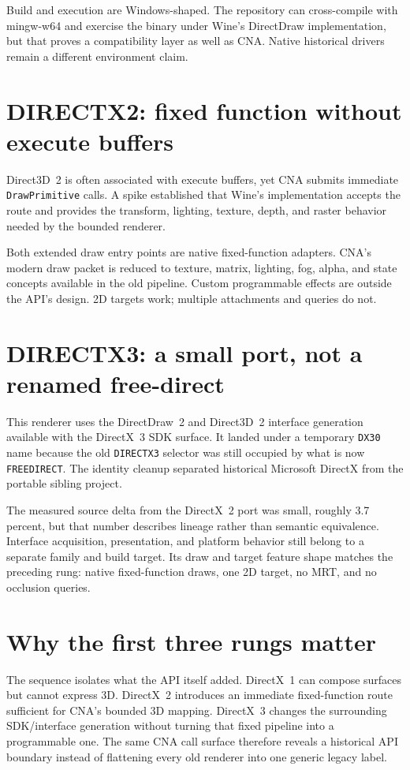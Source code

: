 Build and execution are Windows-shaped.  The repository can cross-compile with mingw-w64 and
exercise the binary under Wine's DirectDraw implementation, but that proves a compatibility
layer as well as CNA.  Native historical drivers remain a different environment claim.

\section{DIRECTX2: fixed function without execute buffers}

Direct3D~2 is often associated with execute buffers, yet CNA submits immediate
\texttt{DrawPrimitive} calls. A spike established that Wine's implementation accepts the route
and provides the transform, lighting, texture,
depth, and raster behavior needed by the bounded renderer.

Both extended draw entry points are native fixed-function adapters.  CNA's modern draw packet
is reduced to texture, matrix, lighting, fog, alpha, and state concepts available in the old
pipeline.  Custom programmable effects are outside the API's design.  2D targets work;
multiple attachments and queries do not.

\section{DIRECTX3: a small port, not a renamed free-direct}

This renderer uses the DirectDraw~2 and Direct3D~2 interface generation available with the
DirectX~3 SDK surface.  It landed under a temporary \texttt{DX30} name because the old
\texttt{DIRECTX3} selector was still occupied by what is now \texttt{FREEDIRECT}.  The
identity cleanup separated historical Microsoft DirectX from the portable sibling project.

The measured source delta from the DirectX~2 port was small, roughly 3.7 percent, but that
number describes lineage rather than semantic equivalence.  Interface acquisition,
presentation, and platform behavior still belong to a separate family and build target.
Its draw and target feature shape matches the preceding rung: native fixed-function draws,
one 2D target, no MRT, and no occlusion queries.

\section{Why the first three rungs matter}

The sequence isolates what the API itself added.  DirectX~1 can compose surfaces but cannot
express 3D.  DirectX~2 introduces an immediate fixed-function route sufficient for CNA's
bounded 3D mapping.  DirectX~3 changes the surrounding SDK/interface generation without
turning that fixed pipeline into a programmable one.  The same CNA call surface therefore
reveals a historical API boundary instead of flattening every old renderer into one
generic legacy label.

